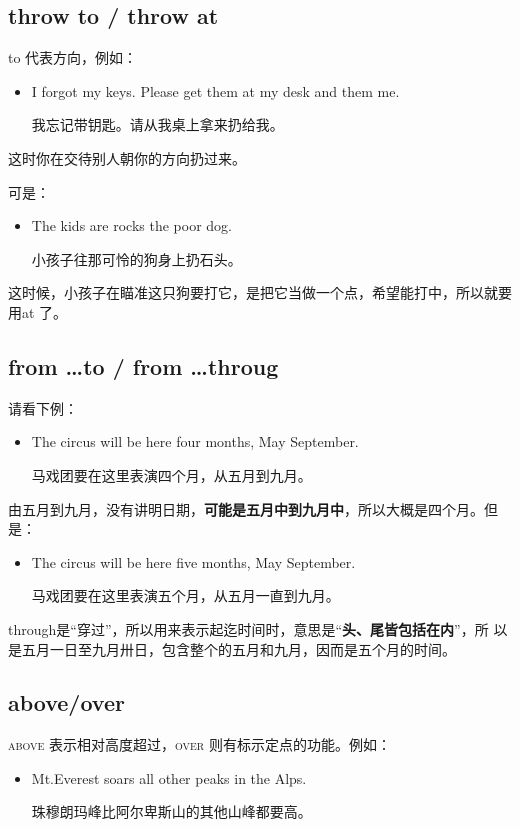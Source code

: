 \subsection{throw to / throw at}

to 代表方向，例如：

\begin{itemize}
\item I forgot my keys. Please get them at my desk and  them
   me.

  我忘记带钥匙。请从我桌上拿来扔给我。
\end{itemize}
这时你在交待别人朝你的方向扔过来。

可是：
\begin{itemize}
\item  The kids are  rocks  the poor dog.

  小孩子往那可怜的狗身上扔石头。
\end{itemize}
这时候，小孩子在瞄准这只狗要打它，是把它当做一个点，希望能打中，所以就要用at
了。

\subsection{from \ldots to / from \ldots throug}

请看下例：
\begin{itemize}
\item The circus will be here four months,  May  September.

  马戏团要在这里表演四个月，从五月到九月。
\end{itemize}
由五月到九月，没有讲明日期，\textbf{可能是五月中到九月中}，所以大概是四个月。但
是：
\begin{itemize}
\item The circus will be here five months,  May  September.

  马戏团要在这里表演五个月，从五月一直到九月。
\end{itemize}
through是“穿过”，所以用来表示起迄时间时，意思是“\textbf{头、尾皆包括在内}”，所
以是五月一日至九月卅日，包含整个的五月和九月，因而是五个月的时间。

\subsection{above/over}

\textsc{above 表示相对高度超过，over 则有标示定点的功能。}例如：
\begin{itemize}
\item  Mt.Everest soars  all other peaks in the Alps.

  珠穆朗玛峰比阿尔卑斯山的其他山峰都要高。
\end{itemize}

